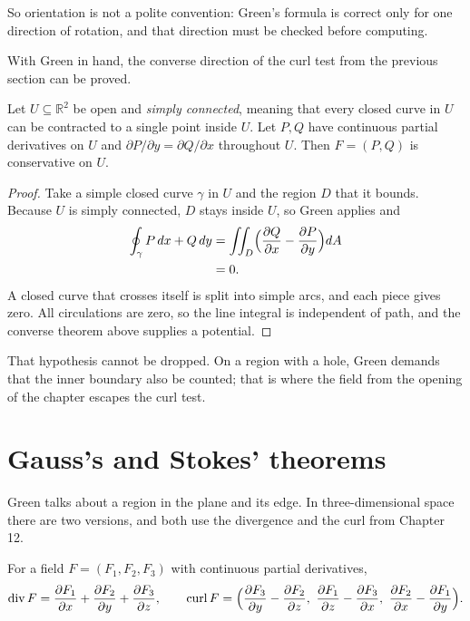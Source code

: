So orientation is not a polite convention: Green's formula is correct only for one
direction of rotation, and that direction must be checked before computing.

With Green in hand, the converse direction of the curl test from the previous section
can be proved.

\begin{akibat}
Let $U\subseteq\mathbb{R}^{2}$ be open and \emph{simply connected},
meaning that every closed curve in $U$ can be contracted to a single point inside
$U$. Let $P,Q$ have continuous partial derivatives on $U$ and $\partial
P/\partial y=\partial Q/\partial x$ throughout $U$. Then $F=(P,Q)$ is conservative
on $U$.
\end{akibat}

\begin{proof}
Take a simple closed curve $\gamma$ in $U$ and the region $D$ that
it bounds. Because $U$ is simply connected, $D$ stays inside $U$, so
Green applies and
\begin{align*}
\oint_{\gamma}P\,dx+Q\,dy
&=\iint_{D}\Bigl(\frac{\partial Q}{\partial x}-\frac{\partial P}{\partial y}\Bigr)dA\\
&=0 .
\end{align*}
A closed curve that crosses itself is split into simple arcs,
and each piece gives zero. All circulations are zero, so the line
integral is independent of path, and the converse theorem above supplies a potential.
\end{proof}

That hypothesis cannot be dropped. On a region with a hole, Green demands that the inner boundary
also be counted; that is where the field from the opening of the chapter escapes the curl test.

\section{Gauss's and Stokes' theorems}

Green talks about a region in the plane and its edge. In three-dimensional space
there are two versions, and both use the divergence and the curl from Chapter 12.

\begin{definisi}
 For a field $F=(F_{1},F_{2},F_{3})$ with
continuous partial derivatives,
\[
\operatorname{div}F=\frac{\partial F_{1}}{\partial x}
+\frac{\partial F_{2}}{\partial y}+\frac{\partial F_{3}}{\partial z},
\qquad
\operatorname{curl}F=\Bigl(\frac{\partial F_{3}}{\partial y}
-\frac{\partial F_{2}}{\partial z},\
\frac{\partial F_{1}}{\partial z}-\frac{\partial F_{3}}{\partial x},\
\frac{\partial F_{2}}{\partial x}-\frac{\partial F_{1}}{\partial y}\Bigr).
\]
\end{definisi}

